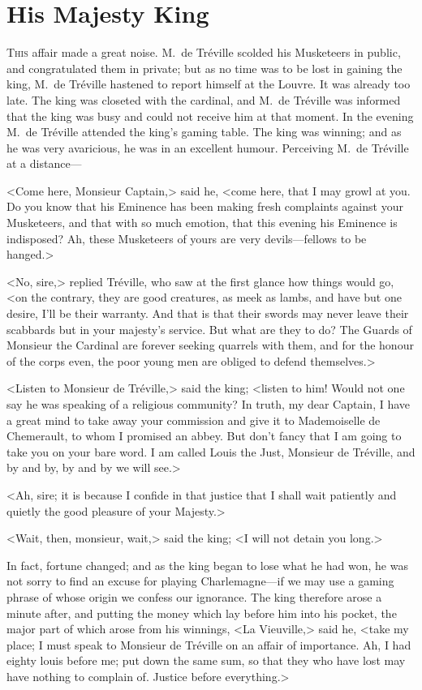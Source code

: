 
\chapter{His Majesty King }

\lettrine{T}{his} affair made a great noise. M.~de Tréville scolded his Musketeers in public, and congratulated them in private; but as no time was to be lost in gaining the king, M.~de Tréville hastened to report himself at the Louvre. It was already too late. The king was closeted with the cardinal, and M.~de Tréville was informed that the king was busy and could not receive him at that moment. In the evening M.~de Tréville attended the king's gaming table. The king was winning; and as he was very avaricious, he was in an excellent humour. Perceiving M.~de Tréville at a distance— 

<Come here, Monsieur Captain,> said he, <come here, that I may growl at you. Do you know that his Eminence has been making fresh complaints against your Musketeers, and that with so much emotion, that this evening his Eminence is indisposed? Ah, these Musketeers of yours are very devils—fellows to be hanged.> 

<No, sire,> replied Tréville, who saw at the first glance how things would go, <on the contrary, they are good creatures, as meek as lambs, and have but one desire, I'll be their warranty. And that is that their swords may never leave their scabbards but in your majesty's service. But what are they to do? The Guards of Monsieur the Cardinal are forever seeking quarrels with them, and for the honour of the corps even, the poor young men are obliged to defend themselves.> 

<Listen to Monsieur de Tréville,> said the king; <listen to him! Would not one say he was speaking of a religious community? In truth, my dear Captain, I have a great mind to take away your commission and give it to Mademoiselle de Chemerault, to whom I promised an abbey. But don't fancy that I am going to take you on your bare word. I am called Louis the Just, Monsieur de Tréville, and by and by, by and by we will see.> 

<Ah, sire; it is because I confide in that justice that I shall wait patiently and quietly the good pleasure of your Majesty.> 

<Wait, then, monsieur, wait,> said the king; <I will not detain you long.> 

In fact, fortune changed; and as the king began to lose what he had won, he was not sorry to find an excuse for playing Charlemagne—if we may use a gaming phrase of whose origin we confess our ignorance. The king therefore arose a minute after, and putting the money which lay before him into his pocket, the major part of which arose from his winnings, <La Vieuville,> said he, <take my place; I must speak to Monsieur de Tréville on an affair of importance. Ah, I had eighty louis before me; put down the same sum, so that they who have lost may have nothing to complain of. Justice before everything.> 

